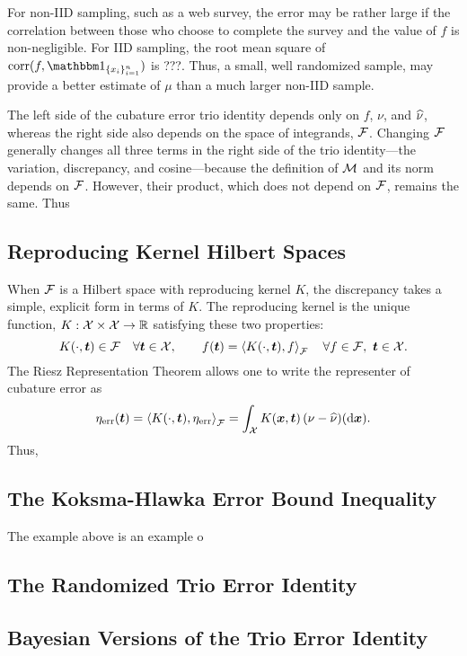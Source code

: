 \documentclass[graybox]{svmult}
\newcommand{\R}{\mathbb{R}} %
\newcommand{\bst}{\boldsymbol{t}}    %
\newcommand{\bsx}{\boldsymbol{x}}    %
\DeclareMathOperator{\corr}{corr}
\begin{document}
\begin{example}
For non-IID sampling, such as a web survey, the error may be rather large if the  correlation between those who choose to complete the survey and the value of $f$  is non-negligible.  For IID sampling, the root mean square of $\corr(f, \bbone_{\{x_i\}_{i=1}^n}) $ is ???.  Thus, a small, well randomized sample, may provide a better estimate of $\mu$ than a much larger non-IID sample.
\end{example}

The left side of the cubature error trio identity depends only on $f$, $\nu$, and $\widehat{\nu}$, whereas the right side also depends on the space of integrands, $\mathcal{F}$.  Changing $\mathcal{F}$ generally changes all three terms in the right side of the trio identity---the variation, discrepancy, and cosine---because the definition of $\mathcal{M}$ and its norm depends on $\mathcal{F}$.  However, their product, which does not depend on $\mathcal{F}$, remains the same.  Thus

\subsection{Reproducing Kernel Hilbert Spaces}
When $\mathcal{F}$ is a Hilbert space with reproducing kernel $K$, the discrepancy takes a simple, explicit form in terms of $K$.  The reproducing kernel is the unique function, $K: \cx \times \cx \to \R$ satisfying these two properties:
\begin{equation}
K(\cdot,\bst) \in \cf \quad \forall \bst \in \cx, \qquad f(\bst) = \ip[\cf]{K(\cdot,\bst)}{f} \quad \forall f \in \cf, \ \bst \in \cx.
\end{equation}
The Riesz Representation Theorem allows one to write the representer of cubature error as 
\begin{equation}
\eta_{\err}(\bst) = \ip[\cf]{K(\cdot,\bst)}{\eta_{\err}} = \int_{\cx} K(\bsx,\bst) \, (\nu - \hnu)(\D\bsx).
\end{equation}
Thus, 

\subsection{The Koksma-Hlawka Error Bound Inequality}
The example above is an example o

\subsection{The Randomized Trio Error Identity}

\subsection{Bayesian Versions of the Trio Error Identity}
\end{document}
